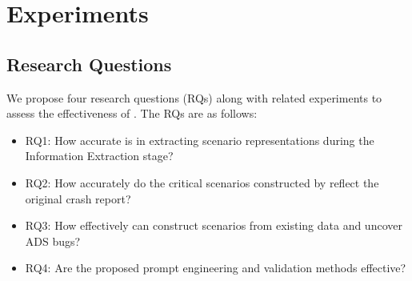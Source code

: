 \section{Experiments}
\label{sec:experiments}
\subsection{Research Questions}
We propose four research questions (RQs) along with related experiments to assess the effectiveness of {\tool}. The RQs are as follows:

\begin{itemize}
\item RQ1: How accurate is {\tool} in extracting scenario representations during the Information Extraction stage?

\item RQ2: How accurately do the critical scenarios constructed by {\tool} reflect the original crash report?

\item RQ3: How effectively can {\tool} construct scenarios from existing data and uncover ADS bugs?

\item RQ4: Are the proposed prompt engineering and validation methods effective?
\end{itemize}


